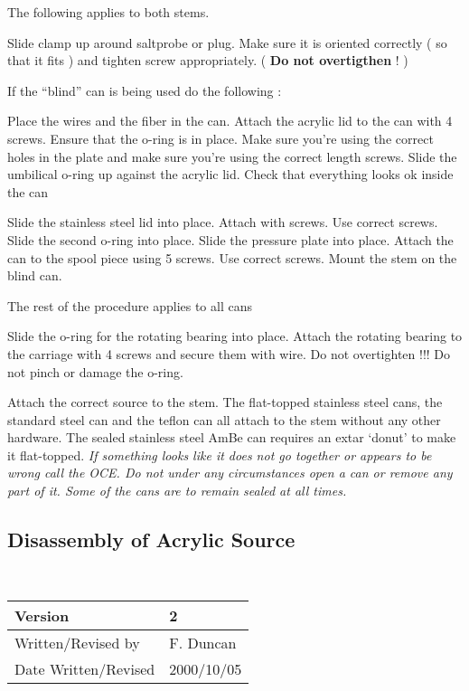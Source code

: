 \begin{enumerate}
     The following applies to both stems.

\checkitem Slide clamp up around saltprobe or plug. Make sure it is oriented correctly ( so that
 it fits ) and
tighten screw appropriately. ( {\bf Do not overtigthen  } ! )

   If the ``blind'' can is being used do the following :

\checkitem Place the wires and the fiber in the can.
\checkitem Attach the acrylic lid to the can with 4 screws. Ensure that the o-ring is in place.
Make sure you're using the correct holes in the plate and make sure you're using the correct
length  screws.
\checkitem Slide the umbilical o-ring up against the acrylic lid.
\checkitem Check that everything looks ok inside the can

\checkitem Slide the stainless steel lid into place. Attach with screws. Use correct screws.
\checkitem Slide the second o-ring into place.
\checkitem Slide the pressure plate into place.
\checkitem Attach the can to the spool piece using 5 screws. Use correct screws.
\checkitem Mount the stem on the blind can.


  The rest of the procedure applies to all cans



\checkitem Slide the o-ring for the rotating bearing into place.
\checkitem Attach the rotating bearing to the carriage with 4 screws and secure them
with wire. Do not overtighten !!!  Do not pinch or damage the o-ring.

\checkitem Attach the correct source to the stem. The flat-topped stainless steel
cans, the standard steel can and the teflon can all attach to the stem without
any other hardware. The sealed stainless steel AmBe  can requires an extar `donut'
to make it flat-topped.
\small
{\em If something looks like it does not go together or appears to be
wrong call the OCE. Do not under any circumstances open a can or remove
any part of it. Some of the cans are to remain sealed at all times.
}

\normalsize


\end{enumerate}


  
\newpage
\subsection{Disassembly of Acrylic Source}
~\\
\noindent
\begin{tabular}{|l|l|}
\hline
Version              & 2 \\
\hline
Written/Revised by   & F. Duncan \\
\hline
Date Written/Revised & 2000/10/05\\
\hline
\end{tabular}
 

